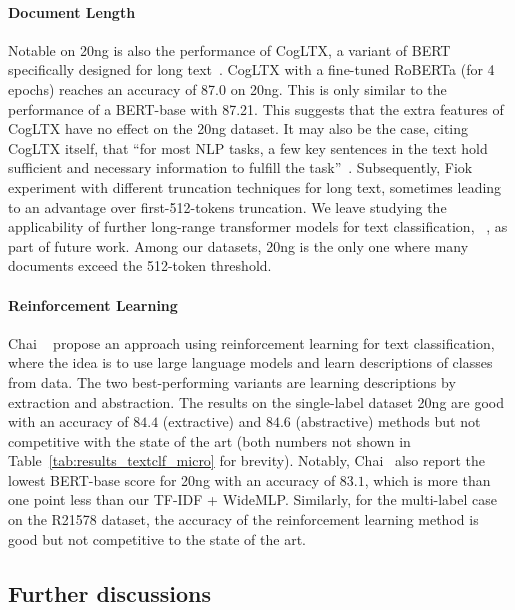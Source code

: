\documentclass[acmsmall,nonacm]{acmart}
\begin{document}
\paragraph{Document Length}
Notable on 20ng is also the performance of CogLTX, a variant of BERT specifically designed for long text~\cite{DBLP:conf/nips/DingZY020}.
CogLTX with a fine-tuned RoBERTa (for 4 epochs) reaches an accuracy of 87.0 on 20ng.
This is only similar to the performance of a BERT-base with 87.21.
This suggests that the extra features of CogLTX have no effect on the 20ng dataset.
It may also be the case, citing CogLTX itself, that 
``for most NLP tasks, a few key sentences in the text hold sufficient and necessary information to fulfill the task''~\cite{DBLP:conf/nips/DingZY020}.
Subsequently, Fiok~\etal~\cite{DBLP:journals/access/FiokKGDWAAZ21} experiment with different truncation techniques for long text, sometimes leading to an advantage over first-512-tokens truncation.
We leave studying the applicability of further long-range transformer models for text classification, \eg ~\cite{DBLP:journals/access/FiokKGDWAAZ21,DBLP:journals/corr/abs-2004-05150}, as part of future work. Among our datasets, 20ng is the only one where many documents exceed the 512-token threshold.

\paragraph{Reinforcement Learning}
Chai \etal~\cite{DBLP:conf/icml/ChaiWHWL20} propose an approach using reinforcement learning for text classification, where the idea is to use large language models and learn descriptions of classes from data.
The two best-performing variants are learning descriptions by extraction and abstraction.
The results on the single-label dataset 20ng are good with an accuracy of $84.4$ (extractive) and $84.6$ (abstractive) methods but not competitive with the state of the art (both numbers not shown in Table~\ref{tab:results_textclf_micro} for brevity).
Notably, Chai~\etal\cite{DBLP:conf/icml/ChaiWHWL20} also report the lowest BERT-base score for 20ng with an accuracy of $83.1$, which is more than one point less than our TF-IDF + WideMLP.
Similarly, for the multi-label case on the R21578 dataset, the accuracy of the reinforcement learning method is good but not competitive to the state of the art.

\subsection{Further discussions}
\end{document}
